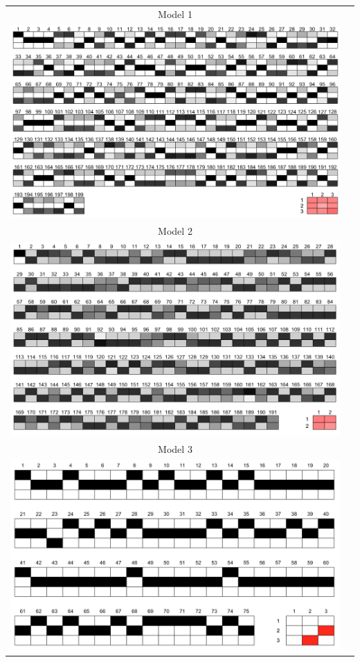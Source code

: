 \documentclass[fleqn,12pt]{wlscirep}
\begin{document}
\clearpage
\begin{longtable}[!h]{c@{\hskip 0cm}c}
Model 1 \\
\includegraphics[height=.26\textheight, clip=true, trim=0cm .25cm 0cm 0cm]{figures/SBM_m1}   \\
Model 2 \\
\includegraphics[height=.26\textheight, clip=true, trim=0cm 0cm 0cm 0cm]{figures/SBM_m2}   \\
Model 3 \\
\includegraphics[height=.26\textheight, clip=true, trim=0cm 0cm 0cm 0cm]{figures/SBM_m3}   \\

\end{longtable}
\end{document}
